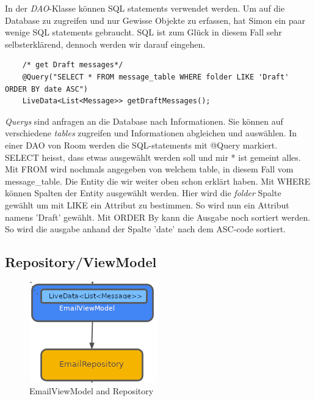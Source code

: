 \documentclass[a4paper,11pt]{article}
\begin{document}
In der \textit{DAO}-Klasse können SQL statements verwendet werden. Um auf die Database zu zugreifen und nur Gewisse 
Objekte zu erfassen, hat Simon ein paar wenige SQL statements gebraucht. SQL ist zum Glück in diesem Fall sehr selbsterklärend, 
dennoch werden wir darauf eingehen.\\


\lstset{language=SQL}
\begin{lstlisting}
    /* get Draft messages*/
    @Query("SELECT * FROM message_table WHERE folder LIKE 'Draft' ORDER BY date ASC")
    LiveData<List<Message>> getDraftMessages();
\end{lstlisting}

\textit{Querys} sind anfragen an die Database nach Informationen. Sie können auf verschiedene \textit{tables} zugreifen und Informationen abgleichen und auswählen. 
In einer DAO von Room werden die SQL-statements mit @Query markiert. SELECT heisst, dass etwas ausgewählt werden soll und mir * ist gemeint alles. Mit FROM wird nochmals angegeben von 
welchem table, in diesem Fall vom message\_table. Die Entity die wir weiter oben schon erklärt haben. Mit WHERE können Spalten der Entity ausgewählt werden. Hier wird die \textit{folder} Spalte 
gewählt um mit LIKE ein Attribut zu bestimmen. So wird nun ein Attribut namens 'Draft' gewählt. Mit ORDER By kann die Ausgabe noch sortiert werden. So wird die ausgabe anhand der Spalte 'date'
nach dem ASC-code sortiert.

\subsection{Repository/ViewModel}

\begingroup
\setlength{\intextsep}{1pt}
\setlength{\columnsep}{4pt}

\begin{figure}
    \centering
    \includegraphics[width=.4\textwidth]{media/ViewModelRepository.png}
    \caption{EmailViewModel and Repository}
\end{figure}
\end{document}
